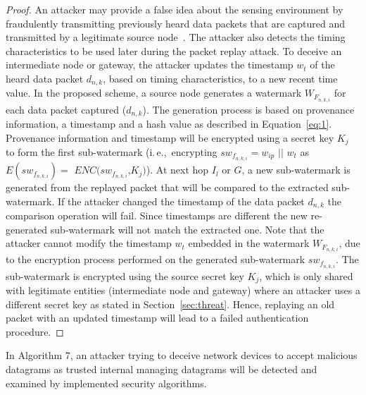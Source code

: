 \documentclass{llncs}
\newcommand{\ie}{i.\,e.,~}
\begin{document}
\begin{proof}
An attacker may provide a false idea about the sensing environment by fraudulently transmitting previously heard data packets that are captured and transmitted by a legitimate source node~\cite{Roosta2008}. The attacker also detects the timing characteristics to be used later during the packet replay attack. To deceive an intermediate node or gateway, the attacker updates the timestamp $w_{t}$ of the heard data packet $d_{n,k}$, based on timing characteristics, to a new recent time value. In the proposed scheme, a source node generates a watermark $W_{F_{n,k,i}}$ for each data packet captured ($d_{n,k}$). The generation process is based on provenance information, a timestamp and a hash value as described in Equation~\eqref{eq:1}. Provenance information and timestamp will be encrypted using a secret key $K_j$ to form the first sub-watermark (\ie encrypting $sw_{f_{n,k,i}} = w_{ip} $ $||$ $w_{t}$ as $E(sw_{f_{n,k,i}}) =$ $ENC(sw_{f_{n,k,i}}$,$K_j)$). At next hop $I_l$ or $G$, a new sub-watermark is generated from the replayed packet that will be compared to the extracted sub-watermark. If the attacker changed the timestamp of the data packet $d_{n,k}$ the comparison operation will fail. Since timestamps are different the new re-generated sub-watermark will not match the extracted one. Note that the attacker cannot modify the timestamp $w_{t}$ embedded in the watermark $W_{F_{n,k,i}}$, due to the encryption process performed on the generated sub-watermark $sw_{f_{n,k,i}}$. The sub-watermark is encrypted using the source secret key $K_j$, which is only shared with legitimate entities (intermediate node and gateway) where an attacker uses a different secret key as stated in Section~\ref{sec:threat}. Hence, replaying an old packet with an updated timestamp will lead to a failed authentication procedure.
\end{proof}

\begin{theorem}
In Algorithm 7, an attacker trying to deceive network devices to accept malicious datagrams as trusted internal managing datagrams will be detected and examined by implemented security algorithms.
\end{theorem}
\end{document}

